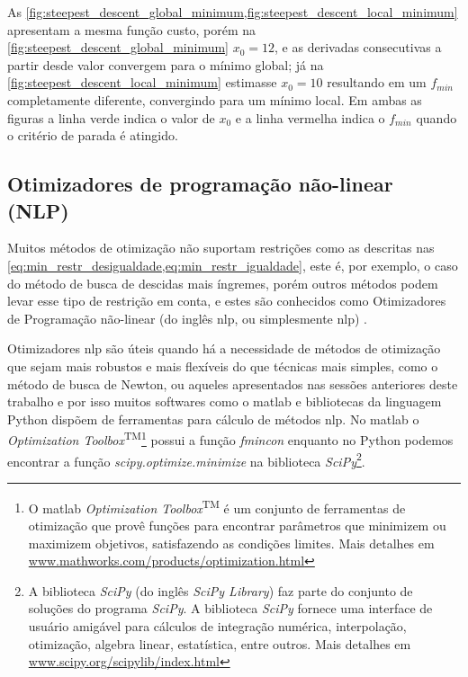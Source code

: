 As \cref{fig:steepest_descent_global_minimum,fig:steepest_descent_local_minimum}
apresentam a mesma função custo, porém na \cref{fig:steepest_descent_global_minimum}
$x_0 = 12$, e as derivadas consecutivas a partir desde valor convergem para o
mínimo global; já na \cref{fig:steepest_descent_local_minimum} estimasse $x_0 = 10$
resultando em um $f_{min}$ completamente diferente, convergindo para um mínimo local.
Em ambas as figuras a linha verde indica o valor de $x_0$ e a linha vermelha indica
o $f_{min}$ quando o critério de parada é atingido.

\subsection{Otimizadores de programação não-linear (NLP)}
\label{subsec:otimizadores_nlp}

Muitos métodos de otimização não suportam restrições como as descritas nas
\cref{eq:min_restr_desigualdade,eq:min_restr_igualdade}, este é, por exemplo, o caso
do método de busca de descidas mais íngremes, porém outros métodos podem levar esse tipo
de restrição em conta, e estes são conhecidos como Otimizadores de Programação não-linear
(do inglês \acrlong{nlp}, ou simplesmente \acrshort{nlp}) \cite{Haugen2018}.

Otimizadores \acrshort{nlp} são úteis quando há a necessidade de métodos de otimização
que sejam mais robustos e mais flexíveis do que técnicas mais simples, como o método
de busca de Newton, ou aqueles apresentados nas sessões anteriores deste trabalho e por
isso muitos softwares como o \acrshort{matlab} e bibliotecas da
linguagem Python dispõem de ferramentas para cálculo de métodos \acrshort{nlp}. No
\acrshort{matlab} o \textit{Optimization Toolbox}\textsuperscript{TM}\footnote{
	O \acrshort{matlab} \textit{Optimization Toolbox}\textsuperscript{TM} é um conjunto					%
	de ferramentas de otimização que provê funções para encontrar parâmetros que minimizem				%
	ou maximizem objetivos, satisfazendo as condições limites. Mais detalhes em							%
	\href{www.mathworks.com/products/optimization.html}{www.mathworks.com/products/optimization.html}	%
} possui a função \textit{fmincon} enquanto no Python podemos encontrar a função
\textit{scipy.optimize.minimize} na biblioteca \textit{SciPy}\footnote{
	A biblioteca \textit{SciPy} (do inglês \textit{SciPy Library}) faz parte do conjunto de				%
	soluções do programa \textit{SciPy}. A biblioteca \textit{SciPy} fornece uma interface				%
	de usuário amigável para cálculos de integração numérica, interpolação, otimização,					%
	algebra linear, estatística, entre outros. Mais detalhes em 										%
	\href{www.scipy.org/scipylib/index.html}{www.scipy.org/scipylib/index.html}							%
}.

